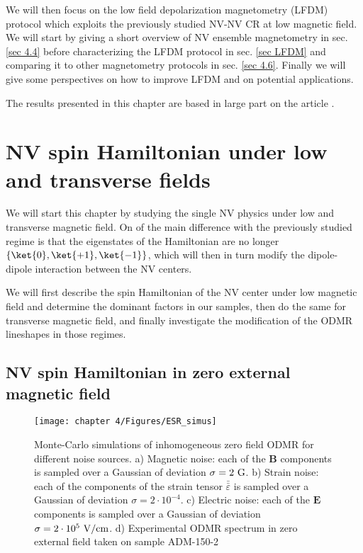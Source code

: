 \documentclass[a4paper, 11pt]{book}
\begin{document}
We will then focus on the low field depolarization magnetometry (LFDM) protocol which exploits the previously studied NV-NV CR at low magnetic field. We will start by giving a short overview of NV ensemble magnetometry in sec. \ref{sec 4.4} before characterizing the LFDM protocol in sec. \ref{sec LFDM} and comparing it to other magnetometry protocols in sec. \ref{sec 4.6}. Finally we will give some perspectives on how to improve LFDM and on potential applications.

The results presented in this chapter are based in large part on the article \citep{pellet2022spin}.

\section{NV spin Hamiltonian under low and transverse fields}
\label{sec 4.1}
We will start this chapter by studying the single NV physics under low and transverse magnetic field. On of the main difference with the previously studied regime is that the eigenstates of the Hamiltonian are no longer $\{ \ket{0}, \ket{+1}, \ket{-1} \}$, which will then in turn modify the dipole-dipole interaction between the NV centers.

We will first describe the spin Hamiltonian of the NV center under low magnetic field and determine the dominant factors in our samples, then do the same for transverse magnetic field, and finally investigate the modification of the ODMR lineshapes in those regimes.

\subsection{NV spin Hamiltonian in zero external magnetic field}
\label{sec. Hamltonian 0 B}
\begin{figure}[h]
\centering
\texttt{[image: chapter 4/Figures/ESR\_simus]}
\caption{Monte-Carlo simulations of inhomogeneous zero field ODMR for different noise sources. a) Magnetic noise: each of the $\mathbf{B}$ components is sampled over a Gaussian of deviation $\sigma=2\ \rm G$. b) Strain noise: each of the components of the strain tensor $\bar{\bar{\varepsilon}}$ is sampled over a Gaussian of deviation $\sigma=2\cdot 10^{-4}$. c) Electric noise: each of the $\mathbf{E}$ components is sampled over a Gaussian of deviation $\sigma=2\cdot 10^{5}\ \rm{V/cm}$. d) Experimental ODMR spectrum in zero external field taken on sample ADM-150-2}
\label{simus ESR}
\end{figure}
\end{document}
